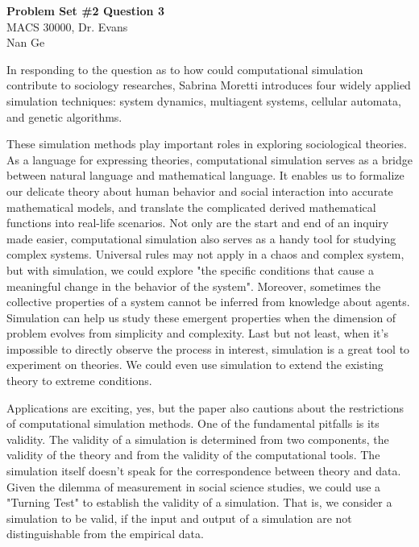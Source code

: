 \documentclass[letterpaper,12pt]{article}
\theoremstyle{definition}
\begin{document}
\begin{flushleft}
  \textbf{\large{Problem Set \#2 Question 3}} \\
  MACS 30000, Dr. Evans \\
  Nan Ge
\end{flushleft}

\vspace{5mm}

In responding to the question as to how could computational simulation contribute to sociology researches, Sabrina Moretti introduces four widely applied simulation techniques: system dynamics, multiagent systems, cellular automata, and genetic algorithms.

These simulation methods play important roles in exploring sociological theories. As a language for expressing theories, computational simulation serves as a bridge between natural language and mathematical language. It enables us to formalize our delicate theory about human behavior and social interaction into accurate mathematical models, and translate the complicated derived mathematical functions into real-life scenarios. Not only are the start and end of an inquiry made easier, computational simulation also serves as a handy tool for studying complex systems. Universal rules may not apply in a chaos and complex system, but with simulation, we could explore "the specific conditions that cause a meaningful change in the behavior of the system".  Moreover, sometimes the collective properties of a system cannot be inferred from knowledge about agents. Simulation can help us study these emergent properties when the dimension of problem evolves from simplicity and complexity. Last but not least, when it's impossible to directly observe the process in interest, simulation is a great tool to experiment on theories. We could even use simulation to extend the existing theory to extreme conditions.

Applications are exciting, yes, but the paper also cautions about the restrictions of computational simulation methods. One of the fundamental pitfalls is its validity. The validity of a simulation is determined from two components, the validity of the theory and from the validity of the computational tools. The simulation itself doesn't speak for the correspondence between theory and data. Given the dilemma of measurement in social science studies, we could use a "Turning Test" to establish the validity of a simulation. That is, we consider a simulation to be valid, if the input and output of a simulation are not distinguishable from the empirical data.
\end{document}
